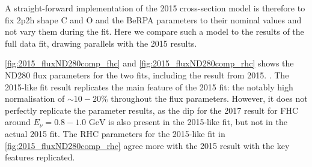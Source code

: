 A straight-forward implementation of the 2015 cross-section model is therefore to fix 2p2h shape C and O and the BeRPA parameters to their nominal values and not vary them during the fit. Here we compare such a model to the results of the full data fit, drawing parallels with the 2015 results.

\autoref{fig:2015_fluxND280comp_fhc} and \autoref{fig:2015_fluxND280comp_rhc} shows the ND280 flux parameters for the two fits, including the result from 2015. \cite{t2k_2015}. The 2015-like fit result replicates the main feature of the 2015 fit: the notably high normalisation of $\sim10-20\%$ throughout the flux parameters. However, it does not perfectly replicate the parameter results, as the dip for the 2017 result for FHC \numu around $E_\nu = 0.8-1.0\text{ GeV}$ is also present in the 2015-like fit, but not in the actual 2015 fit. The RHC parameters for the 2015-like fit in \autoref{fig:2015_fluxND280comp_rhc} agree more with the 2015 result with the key features replicated.

